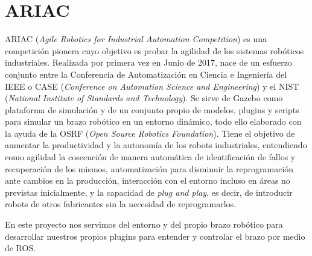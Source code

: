 \section{ARIAC}
\label{sec:plat_ariac}

ARIAC\cite{ariac} (\textit{Agile Robotics for Industrial Automation Competition}) es una competición pionera cuyo objetivo es probar la agilidad de los sistemas robóticos industriales. Realizada por primera vez en Junio de 2017, nace de un esfuerzo conjunto entre la Conferencia de Automatización en Ciencia e Ingeniería del IEEE o CASE (\textit{Conference on Automation Science and Engineering}) y el NIST (\textit{National Institute of Standards and Technology}). Se sirve de Gazebo como plataforma de simulación y de un conjunto propio de modelos, plugins y scripts para simular un brazo robótico en un entorno dinámico, todo ello elaborado con la ayuda de la OSRF (\textit{Open Source Robotics Foundation}). Tiene el objetivo de aumentar la productividad y la autonomía de los robots industriales, entendiendo como agilidad la cosecución de manera automática de identificación de fallos y recuperación de los mismos, automatización para disminuir la reprogramación ante cambios en la producción, interacción con el entorno incluso en áreas no previstas inicialmente, y la capacidad de \textit{plug and play}, es decir, de introducir robots de otros fabricantes sin la necesidad de reprogramarlos.

En este proyecto nos servimos del entorno y del propio brazo robótico para desarrollar nuestros propios plugins para entender y controlar el brazo por medio de ROS.




